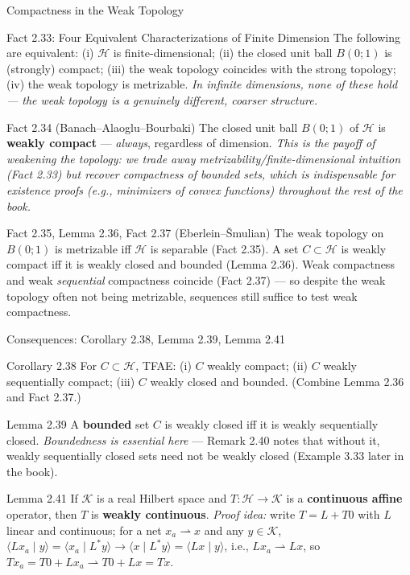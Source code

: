 \documentclass[aspectratio=169,10pt]{beamer}
\newcommand{\Hil}{\mathcal{H}}
\newcommand{\Kil}{\mathcal{K}}
\newcommand{\wto}{\rightharpoonup}
\newcommand{\ip}[2]{\langle #1 \mid #2 \rangle}
\begin{document}
\begin{frame}{Compactness in the Weak Topology}
  \begin{block}{Fact 2.33: Four Equivalent Characterizations of Finite Dimension}
    The following are equivalent: (i) $\Hil$ is finite-dimensional; (ii)
    the closed unit ball $B(0;1)$ is (strongly) compact; (iii) the weak
    topology coincides with the strong topology; (iv) the weak topology is
    metrizable. \textit{In infinite dimensions, none of these hold --- the
    weak topology is a genuinely different, coarser structure.}
  \end{block}

  \begin{block}{Fact 2.34 (Banach--Alaoglu--Bourbaki)}
    The closed unit ball $B(0;1)$ of $\Hil$ is \textbf{weakly compact} ---
    \emph{always}, regardless of dimension. \textit{This is the payoff of
    weakening the topology: we trade away metrizability/finite-dimensional
    intuition (Fact 2.33) but recover compactness of bounded sets, which is
    indispensable for existence proofs (e.g., minimizers of convex
    functions) throughout the rest of the book.}
  \end{block}

  \begin{block}{Fact 2.35, Lemma 2.36, Fact 2.37 (Eberlein--\v Smulian)}
    The weak topology on $B(0;1)$ is metrizable iff $\Hil$ is separable
    (Fact 2.35). A set $C\subset\Hil$ is weakly compact iff it is weakly
    closed and bounded (Lemma 2.36). Weak compactness and weak
    \emph{sequential} compactness coincide (Fact 2.37) --- so despite the
    weak topology often not being metrizable, sequences still suffice to
    test weak compactness.
  \end{block}
\end{frame}

\begin{frame}{Consequences: Corollary 2.38, Lemma 2.39, Lemma 2.41}
  \begin{block}{Corollary 2.38}
    For $C\subset\Hil$, TFAE: (i) $C$ weakly compact; (ii) $C$ weakly
    sequentially compact; (iii) $C$ weakly closed and bounded. (Combine
    Lemma 2.36 and Fact 2.37.)
  \end{block}

  \begin{block}{Lemma 2.39}
    A \textbf{bounded} set $C$ is weakly closed iff it is weakly
    sequentially closed. \textit{Boundedness is essential here} ---
    Remark 2.40 notes that without it, weakly sequentially closed sets
    need not be weakly closed (Example 3.33 later in the book).
  \end{block}

  \begin{block}{Lemma 2.41}
    If $\Kil$ is a real Hilbert space and $T:\Hil\to\Kil$ is a
    \textbf{continuous affine} operator, then $T$ is \textbf{weakly
    continuous}. \textit{Proof idea:} write $T=L+T0$ with $L$ linear and
    continuous; for a net $x_a\wto x$ and any $y\in\Kil$, $\ip{Lx_a}{y} =
    \ip{x_a}{L^*y}\to\ip{x}{L^*y}=\ip{Lx}{y}$, i.e., $Lx_a\wto Lx$, so
    $Tx_a = T0+Lx_a \wto T0+Lx = Tx$.
  \end{block}
\end{frame}
\end{document}
